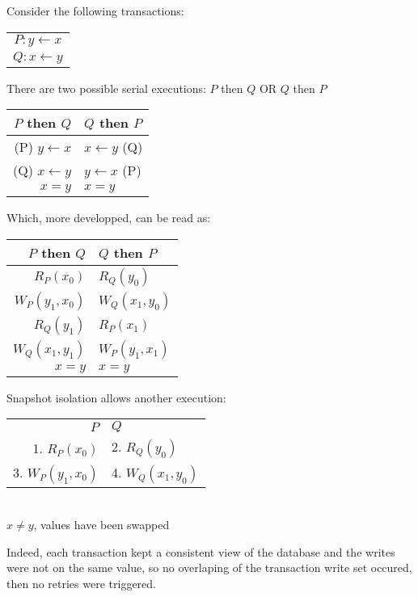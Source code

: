 Consider the following transactions:
\begin{table}[H]
  \centering
  \begin{tabular}{ c }
    $P:   y \gets x$\\
    $Q:   x \gets y$\\
  \end{tabular}
\end{table}


There are two possible serial executions: $P$ then $Q$ OR $Q$ then $P$
\begin{table}[H]
  \centering
  \begin{tabular}{ r | l }
    $P$ then $Q$ & $Q$ then $P$ \\
        \hline
    (P) $y \gets x$ & $x \gets y$ (Q) \\
    (Q) $x \gets y$ & $y \gets x$ (P) \\
    $x = y$ & $x = y$ \\
  \end{tabular}
\end{table}
Which, more developped, can be read as:
\begin{table}[H]
  \centering
  \begin{tabular}{ r | l }
    $P$ then $Q$ & $Q$ then $P$ \\
        \hline
    $R_P(x_0)$ &  $R_Q(y_0)$ \\
    $W_P(y_1, x_0)$ & $W_Q(x_1, y_0)$ \\
    $R_Q(y_1)$ &  $R_P(x_1)$ \\
    $W_Q(x_1, y_1)$ & $W_P(y_1, x_1)$ \\
    $x = y$ & $x = y$ \\
  \end{tabular}
\end{table}

Snapshot isolation allows another execution:

\begin{table}[H]
  \centering
  \begin{tabular}{ r  l }
    $P$ & $Q$ \\
    1. $R_P(x_0)$ & 2. $R_Q(y_0)$ \\
    3. $W_P(y_1, x_0)$ & 4. $W_Q(x_1, y_0)$ \\
  \end{tabular}
  \\
  $x \neq y$, values have been swapped
\end{table}

Indeed, each transaction kept a consistent view of the database and the writes were not on the same value, so no overlaping of the transaction write set occured, then no retries were triggered.

